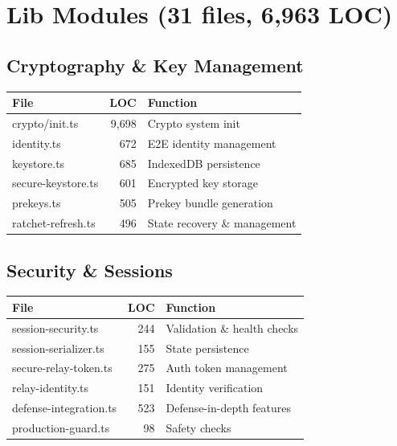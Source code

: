 \documentclass[11pt,a4paper,oneside]{book}
\begin{document}
\vspace{-0.3cm}\section{Lib Modules (31 files, 6,963 LOC)}
\vspace{-0.2cm}\subsection{Cryptography \& Key Management}
\begin{table}[h]
\centering
\begin{tabular}{|l|r|l|}
\hline
\textbf{File} & \textbf{LOC} & \textbf{Function} \\
\hline
crypto/init.ts & 9,698 & Crypto system init \\
\hline
identity.ts & 672 & E2E identity management \\
\hline
keystore.ts & 685 & IndexedDB persistence \\
\hline
secure-keystore.ts & 601 & Encrypted key storage \\
\hline
prekeys.ts & 505 & Prekey bundle generation \\
\hline
ratchet-refresh.ts & 496 & State recovery \& management \\
\hline
\end{tabular}
\end{table}
\vspace{-0.2cm}\subsection{Security \& Sessions}
\begin{table}[h]
\centering
\begin{tabular}{|l|r|l|}
\hline
\textbf{File} & \textbf{LOC} & \textbf{Function} \\
\hline
session-security.ts & 244 & Validation \& health checks \\
\hline
session-serializer.ts & 155 & State persistence \\
\hline
secure-relay-token.ts & 275 & Auth token management \\
\hline
relay-identity.ts & 151 & Identity verification \\
\hline
defense-integration.ts & 523 & Defense-in-depth features \\
\hline
production-guard.ts & 98 & Safety checks \\
\hline
\end{tabular}
\end{table}
\end{document}
